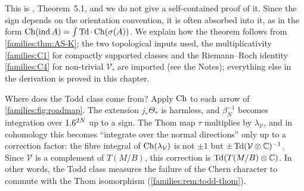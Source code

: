 This is \cite{Atiyah-Singer-IV}, Theorem~5.1, and we do not give a
self-contained proof of it. Since the sign depends on the
orientation convention, it is often absorbed into it, as in the form
$\operatorname{Ch}(\operatorname{ind} A)=\int\operatorname{Td}\cdot\operatorname{Ch}(\sigma(A))$. We explain how the theorem follows
from \cref{families:thm:AS-K}; the two topological inputs used, the
multiplicativity \ref{families:C1} for compactly supported classes and the
Riemann--Roch identity \ref{families:C4} for non-trivial $\mathcal V$, are
imported (see the Notes); everything else in the derivation is proved in
this chapter.

\begin{discussion}
  Where does the Todd class come from? Apply $\operatorname{Ch}$ to each arrow of
  \cref{families:fig:roadmap}. The extension $j_*\Theta_*$ is harmless, and
  $\beta_N^{-1}$ becomes integration over $1.6^{2N}$ up to a sign. The Thom map $\tau$
  multiplies by $\lambda_{\mathcal V}$, and in cohomology this becomes ``integrate
  over the normal directions'' only up to a correction factor: the fibre integral of
  $\operatorname{Ch}(\lambda_{\mathcal V})$ is not $\pm1$ but $\pm\operatorname{Td}(\mathcal V\otimes\mathbb{C})^{-1}$.
  Since $\mathcal V$ is a complement of $T(M/B)$, this correction is
  $\operatorname{Td}(T(M/B)\otimes\mathbb{C})$. In other words, the Todd class measures the failure of
  the Chern character to commute with the Thom isomorphism
  (\cref{families:rem:todd-thom}).
\end{discussion}


